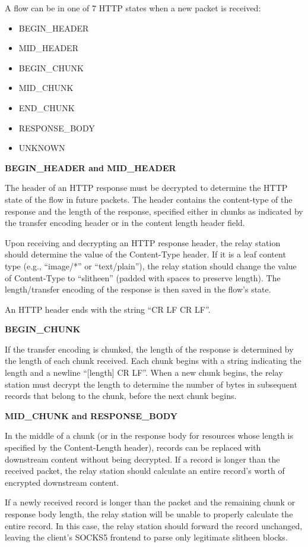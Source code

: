 \documentclass[11pt]{article}
\theoremstyle{definittion}
\begin{document}
A flow can be in one of 7 HTTP states when a new packet is received:
\begin{itemize}
\item BEGIN\_HEADER
\item MID\_HEADER
\item BEGIN\_CHUNK
\item MID\_CHUNK
\item END\_CHUNK
\item RESPONSE\_BODY
\item UNKNOWN
\end{itemize}

\textbf{BEGIN\_HEADER and MID\_HEADER}

The header of an HTTP response must be decrypted to determine the HTTP state of the flow in future packets. The header contains the content-type of the response and the length of the response, specified either in chunks as indicated by the transfer encoding header or in the content length header field.

Upon receiving and decrypting an HTTP response header, the relay station should determine the value of the Content-Type header. If it is a leaf content type (e.g., ``image/*'' or ``text/plain''), the relay station should change the value of Content-Type to ``slitheen'' (padded with spaces to preserve length). The length/transfer encoding of the response is then saved in the flow's state.

An HTTP header ends with the string ``CR LF CR LF''.

\textbf{BEGIN\_CHUNK}

If the transfer encoding is chunked, the length of the response is determined by the length of each chunk received. Each chunk begins with a string indicating the length and a newline ``[length] CR LF''. When a new chunk begins, the relay station must decrypt the length to determine the number of bytes in subsequent records that belong to the chunk, before the next chunk begins.

\textbf{MID\_CHUNK and RESPONSE\_BODY}

In the middle of a chunk (or in the response body for resources whose length is specified by the Content-Length header), records can be replaced with downstream content without being decrypted. If a record is longer than the received packet, the relay station should calculate an entire record's worth of encrypted downstream content. 

If a newly received record is longer than the packet and the remaining chunk or response body length, the relay station will be unable to properly calculate the entire record. In this case, the relay station should forward the record unchanged, leaving the client's SOCKS5 frontend to parse only legitimate slitheen blocks.
\end{document}

